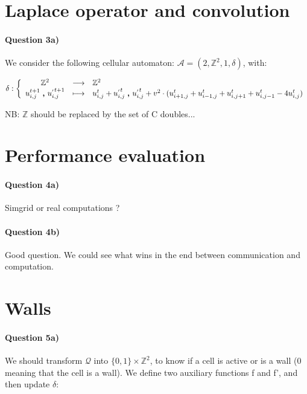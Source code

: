 \documentclass[a4paper,12pt]{article}
\begin{document}
\section{Laplace operator and convolution}

\paragraph{Question 3a)} We consider the following cellular automaton: $\mathcal{A} = (2, \mathbb{Z}^2, 1, \delta)$, with:

\begin{eqnarray*}
\delta : \left \{ \begin{array}{c c l }
  \mathbb{Z}^2 & \longrightarrow & \mathbb{Z}^2 \\
  u^{t+1}_{i,j}\ \pmb{,} \ u^{_{'} t+1}_{i,j} & \longmapsto & u^{t}_{i,j} + u^{_{'} t}_{i,j}\ \pmb{,} \ u^{_{'} t}_{i,j} + v^2 \cdot (u^t_{i+1,j} + u^t_{i-1, j} + u^t_{i, j+1} + u^t_{i, j-1} - 4 u^t_{i, j})\\
  \end{array} \right .
\end{eqnarray*}

NB: $\mathbb{Z}$ should be replaced by the set of C doubles...

\section{Performance evaluation}

\paragraph{Question 4a)} Simgrid or real computations ?

\paragraph{Question 4b)} Good question. We could see what wins in the end between communication and computation.


\section{Walls}

\paragraph{Question 5a)} We should transform $\mathcal{Q}$ into $\{0, 1\} \times \mathbb{Z}^2$, to know if a cell is active or is a wall (0 meaning that the cell is a wall). We define two auxiliary functions f and f', and then update $\delta$: 
\end{document}
